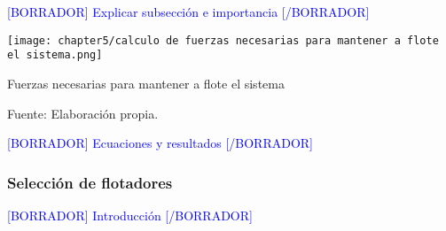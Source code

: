 \textcolor{blue}{[BORRADOR] Explicar subsección e importancia [/BORRADOR]} 

\begin{myfigure}[H]
	\footnotesize\centering
	\texttt{[image: chapter5/calculo de fuerzas necesarias para mantener a flote el sistema.png]}
	\caption{Fuerzas necesarias para mantener a flote el sistema}
	\begin{myflushcenter}
		Fuente: Elaboración propia.
	\end{myflushcenter}
	\label{fig:calculo de fuerzas necesarias para mantener a flote el sistema}
\end{myfigure}

\textcolor{blue}{[BORRADOR] Ecuaciones y resultados [/BORRADOR]} 

\subsubsection{Selección de flotadores}

\textcolor{blue}{[BORRADOR] Introducción [/BORRADOR]} 

